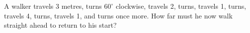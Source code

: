 A walker travels 3 metres, turns $ 60^\circ $ clockwise, travels 2, turns, travels 1, turns, travels 4, turns, travels 1, and turns once more. How far must he now walk straight ahead to return to his start?
